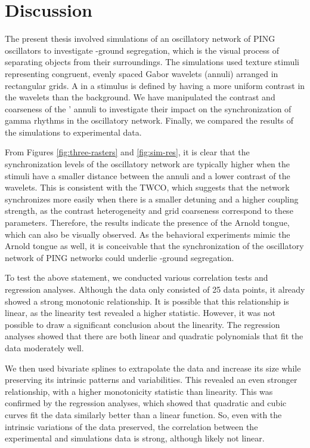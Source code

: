 \section{Discussion}

The present thesis involved simulations of an oscillatory network of PING oscillators to investigate \stimfig-ground segregation, which is the visual process of separating objects from their surroundings. The simulations used texture stimuli representing congruent, evenly spaced Gabor wavelets (annuli) arranged in rectangular grids. A \stimfig{} in a stimulus is defined by having a more uniform contrast in the wavelets than the background. We have manipulated the contrast and coarseness of the \stimfigs' annuli to investigate their impact on the synchronization of gamma rhythms in the oscillatory network. Finally, we compared the results of the simulations to experimental data.

From Figures \ref{fig:three-rasters} and \ref{fig:sim-res}, it is clear that the synchronization levels of the oscillatory network are typically higher when the stimuli have a smaller distance between the annuli and a lower contrast of the wavelets. This is consistent with the TWCO, which suggests that the network synchronizes more easily when there is a smaller detuning and a higher coupling strength, as the contrast heterogeneity and grid coarseness correspond to these parameters. Therefore, the results indicate the presence of the Arnold tongue, which can also be visually observed.
As the behavioral experiments mimic the Arnold tongue as well, it is conceivable that the synchronization of the oscillatory network of PING networks could underlie \stimfig-ground segregation.

To test the above statement, we conducted various correlation tests and regression analyses. Although the data only consisted of 25 data points, it already showed a strong monotonic relationship. It is possible that this relationship is linear, as the linearity test revealed a higher statistic. However, it was not possible to draw a significant conclusion about the linearity.
The regression analyses showed that there are both linear and quadratic polynomials that fit the data moderately well. 

We then used bivariate splines to extrapolate the data and increase its size while preserving its intrinsic patterns and variabilities. This revealed an even stronger relationship, with a higher monotonicity statistic than linearity. This was confirmed by the regression analyses, which showed that quadratic and cubic curves fit the data similarly better than a linear function. So, even with the intrinsic variations of the data preserved, the correlation between the experimental and simulations data is strong, although likely not linear.

